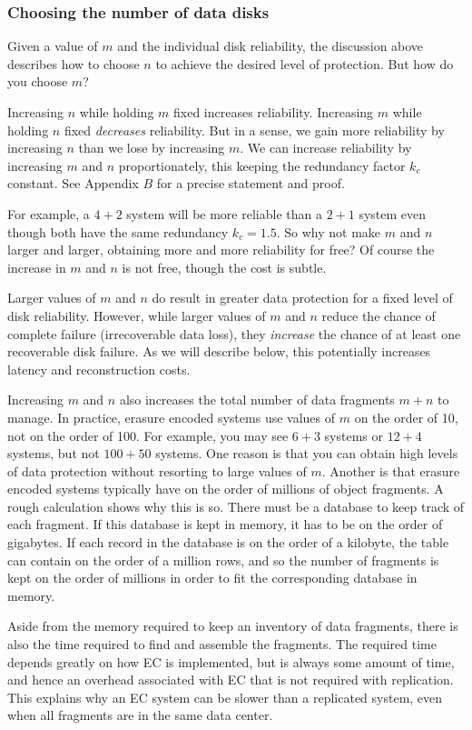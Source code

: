 \documentclass[11pt]{article}
\begin{document}
\subsubsection{Choosing the number of data disks}

Given a value of $m$ and the individual disk reliability, the discussion above describes how to choose $n$ to achieve the desired level of protection. But how do you choose $m$?

Increasing $n$ while holding $m$ fixed increases reliability. Increasing $m$ while holding $n$ fixed \emph{decreases} reliability. But in a sense, we gain more reliability by increasing $n$ than we lose by increasing $m$. We can increase reliability by increasing $m$ and $n$ proportionately, this keeping the redundancy factor $k_c$ constant. See Appendix $B$ for a precise statement and proof.

For example, a $4+2$ system will be more reliable than a $2+1$ system even though both have the same redundancy $k_c = 1.5$. So why not make $m$ and $n$ larger and larger, obtaining more and more reliability for free? Of course the increase in $m$ and $n$ is not free, though the cost is subtle.

Larger values of $m$ and $n$ do result in greater data protection for a fixed level of disk reliability. However, while larger values of $m$ and $n$ reduce the chance of complete failure (irrecoverable data loss), they \emph{increase} the chance of at least one recoverable disk failure. As we will describe below, this potentially increases latency and reconstruction costs.

Increasing $m$ and $n$ also increases the total number of data fragments $m+n$ to manage. In practice, erasure encoded systems use values of $m$ on the order of 10, not on the order of 100.  For example, you may see $6+3$ systems or $12+4$ systems, but not $100+50$ systems. One reason is that you can obtain high levels of data protection without resorting to large values of $m$. Another is that erasure encoded systems typically have on the order of millions of object fragments. A rough calculation shows why this is so. There must be a database to keep track of each fragment. If this database is kept in memory, it has to be on the order of gigabytes. If each record in the database is on the order of a kilobyte, the table can contain on the order of a million rows, and so the number of fragments is kept on the order of millions in order to fit the corresponding database in memory.

Aside from the memory required to keep an inventory of data fragments, there is also the time required to find and assemble the fragments. The required time depends greatly on how EC is implemented, but is always some amount of time, and hence an overhead associated with EC that is not required with replication. This explains why an EC system can be slower than a replicated system, even when all fragments are in the same data center.
\end{document}

